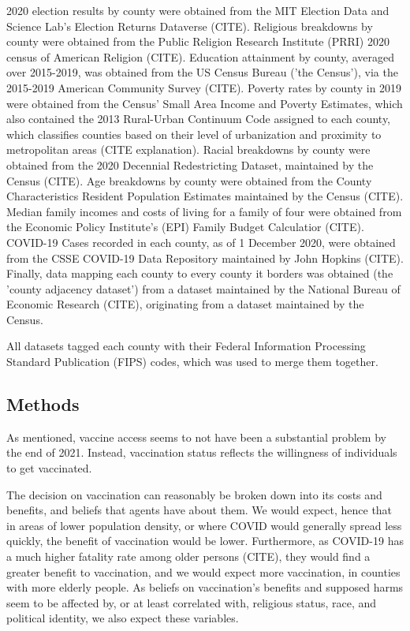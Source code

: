 \documentclass[12pt]{article}
\begin{document}
\begin{spacing}{1.5}
		2020 election results by county were obtained from the MIT Election Data and Science Lab's Election Returns Dataverse (CITE). Religious breakdowns by county were obtained from the Public Religion Research Institute (PRRI) 2020 census of American Religion (CITE). Education attainment by county, averaged over 2015-2019, was obtained from the US Census Bureau ('the Census'), via the 2015-2019 American Community Survey (CITE). Poverty rates by county in 2019 were obtained from the Census' Small Area Income and Poverty Estimates, which also contained the 2013 Rural-Urban Continuum Code assigned to each county, which classifies counties based on their level of urbanization and proximity to metropolitan areas (CITE explanation). Racial breakdowns by county were obtained from the 2020 Decennial Redestricting Dataset, maintained by the Census (CITE). Age breakdowns by county were obtained from the County Characteristics Resident Population Estimates maintained by the Census (CITE). Median family incomes and costs of living for a family of four were obtained from the Economic Policy Institute's (EPI) Family Budget Calculatior (CITE).  COVID-19 Cases recorded in each county, as of 1 December 2020, were obtained from the CSSE COVID-19 Data Repository maintained by John Hopkins (CITE). Finally, data mapping each county to every county it borders was obtained (the 'county adjacency dataset') from a dataset maintained by the National Bureau of Economic Research (CITE), originating from a dataset maintained by the Census. 
		
		All datasets tagged each county with their Federal Information Processing Standard Publication (FIPS) codes, which was used to merge them together.
		\subsection{Methods}
		As mentioned, vaccine access seems to not have been a substantial problem by the end of 2021. Instead, vaccination status reflects the willingness of individuals to get vaccinated.
		
		The decision on vaccination can reasonably be broken down into its costs and benefits, and beliefs that agents have about them. We would expect, hence that in areas of lower population density, or where COVID would generally spread less quickly, the benefit of vaccination would be lower. Furthermore, as COVID-19 has a much higher fatality rate among older persons (CITE), they would find a greater benefit to vaccination, and we would expect more vaccination, in counties with more elderly people. As beliefs on vaccination's benefits and supposed harms seem to be affected by, or at least correlated with, religious status, race, and political identity, we also expect these variables.
		

\end{spacing}
\end{document}
